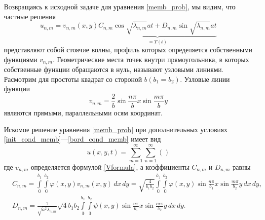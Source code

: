 Возвращаясь к исходной задаче для уравнения \eqref{memb_prob}, мы видим, что частные решения
\begin{equation}
	u_{n, m} = v_{n, m}(x, y) \underbrace{C_{n, m} \cos{\sqrt{\lambda_{n, m}} a t} + D_{n, m} \sin{\sqrt{\lambda_{n, m}} a t}}_{=T(t)}
\end{equation}
представляют собой стоячие волны, профиль которых определяется собственными функциями $v_{n, m}$. Геометрические места точек внутри прямоугольника, в которых собственные функции обращаются в нуль, называют узловыми линиями. Расмотрим для простоты квадрат со стороной $b (b_1 = b_2)$. Узловые линии функции 
\begin{equation}
	v_{n, m} = \frac{2}{b} \sin{\frac{n \pi}{b} x} \sin{\frac{m \pi}{b} y}
\end{equation}
являются прямыми, параллельными осям координат. 

Искомое решение уравнения \eqref{memb_prob} при дополнительных условиях \eqref{init_cond_memb}---\eqref{bord_cond_memb} имеет вид
\begin{equation*}
	u(x, y, t) = \sum \limits_{m = 1}^{\infty} \sum \limits_{n = 1}^{\infty} ()
\end{equation*}
где $v_{n, m}$ определяется формулой \eqref{Vformula}, а коэффициенты $C_{n, m}$ и $D_{n, m}$ равны
\begin{align*}
	&C_{n, m} = \int \limits_{0}^{b_1} \int \limits_{0}^{b_2} \varphi(x, y) v_{n, m}(x, y) \, dx \, dy = \sqrt{\frac{4}{b_1 b_2}} \int \limits_{0}^{b_1} \int \limits_{0}^{b_2} \varphi(x, y) \sin{\frac{n \pi}{b_1} x} \sin{\frac{m \pi}{b_2} y} \, dx \, dy, \\
	&D_{n, m} = \frac{1}{\sqrt{a^2 \lambda_{n, m}}} \sqrt{4}{b_1 b_2} \int \limits_{0}^{b_1} \int \limits_{0}^{b_2} \psi(x, y) \sin{\frac{n \pi}{b_1} x} \sin{\frac{m \pi}{b_2} y} \, dx \, dy.
\end{align*}